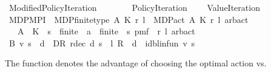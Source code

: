 %
\begin{isabellebody}%
%
%
\isadelimtheory
\isanewline
\isanewline
%
\endisadelimtheory
%
\isatagtheory
{}\isamarkupfalse%
\ Modified{\isacharunderscore}{\kern0pt}Policy{\isacharunderscore}{\kern0pt}Iteration\isanewline
\ \ \ \isanewline
\ \ \ \ Policy{\isacharunderscore}{\kern0pt}Iteration\isanewline
\ \ \ \ Value{\isacharunderscore}{\kern0pt}Iteration\isanewline
{}%
\endisatagtheory
{\isafoldtheory}%
%
\isadelimtheory
%
\endisadelimtheory
%
\isadelimdocument
%
\endisadelimdocument
%
\isatagdocument
%
\isamarkuptrue%
%
\endisatagdocument
{\isafolddocument}%
%
\isadelimdocument
%
\endisadelimdocument
{}\isamarkupfalse%
\ MDP{\isacharunderscore}{\kern0pt}MPI\ {\isacharequal}{\kern0pt}\ MDP{\isacharunderscore}{\kern0pt}finite{\isacharunderscore}{\kern0pt}type\ A\ K\ r\ l\ {\isacharplus}{\kern0pt}\ MDP{\isacharunderscore}{\kern0pt}act\ A\ K\ r\ l\ arb{\isacharunderscore}{\kern0pt}act\isanewline
\ \ \ A\ \ K\ {\isacharcolon}{\kern0pt}{\isacharcolon}{\kern0pt}\ {\isachardoublequoteopen}{\isacharprime}{\kern0pt}s\ {\isacharcolon}{\kern0pt}{\isacharcolon}{\kern0pt}\ finite\ {\isasymtimes}\ {\isacharprime}{\kern0pt}a\ {\isacharcolon}{\kern0pt}{\isacharcolon}{\kern0pt}\ finite\ {\isasymRightarrow}\ {\isacharprime}{\kern0pt}s\ pmf{\isachardoublequoteclose}\ \ r\ l\ arb{\isacharunderscore}{\kern0pt}act\isanewline
{}%
\isadelimdocument
%
\endisadelimdocument
%
\isatagdocument
%
\isamarkuptrue%
%
\endisatagdocument
{\isafolddocument}%
%
\isadelimdocument
%
\endisadelimdocument
{}\isamarkupfalse%
\ {\isachardoublequoteopen}B\ v\ s\ {\isacharequal}{\kern0pt}\ {\isacharparenleft}{\kern0pt}{\isasymSqunion}d\ {\isasymin}\ D\isactrlsub R{\isachardot}{\kern0pt}\ {\isacharparenleft}{\kern0pt}r{\isacharunderscore}{\kern0pt}dec\ d\ s\ {\isacharplus}{\kern0pt}\ {\isacharparenleft}{\kern0pt}l\ {\isacharasterisk}{\kern0pt}\isactrlsub R\ {\isasymP}\ d\ {\isacharminus}{\kern0pt}\ id{\isacharunderscore}{\kern0pt}blinfun{\isacharparenright}{\kern0pt}\ v\ s{\isacharparenright}{\kern0pt}{\isacharparenright}{\kern0pt}{\isachardoublequoteclose}%
\begin{isamarkuptext}%
The function  denotes the advantage of choosing the optimal action vs.

\end{isamarkuptext}
\end{isabellebody}
